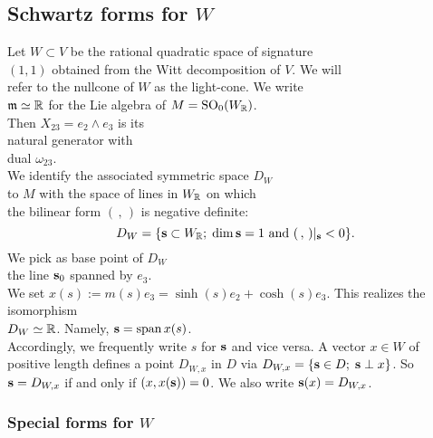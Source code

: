 \subsection{Schwartz forms for $W$}




Let $W\subset V$ be the rational quadratic space of signature\\ $(1,1)$ obtained from the Witt decomposition of $V$. We will\\ refer to the nullcone of $W$ as the light-cone. We write\\
$\mathfrak{m} \simeq \mathbb{R}$ for the Lie algebra of $M = \operatorname{SO}_0(W_{\mathbb{R}})$.\\ Then $X_{23} = e_2 \wedge e_3$ is its\\
natural generator with\\dual $\omega_{23}$.\\
We identify the associated symmetric space $D_W$\\
to $M$ with the space of lines in $W_{\mathbb{R}}$ on which\\
the bilinear form $(\,,\,)$ is negative definite: \[D_W = \{{\bf s} \subset W_{\mathbb{R}} ; \;\text{$\dim {\bf s} =1$ and $(\,,\,)|_{\bf s} < 0$} \}. \] We pick as base point of $D_W$\\
the line ${\bf s}_0$ spanned by $e_3$.\\
We set $ x(s) := m(s) e_3 = \sinh(s) e_2 + \cosh(s) e_3$. This realizes the isomorphism\\
$D_W \simeq \mathbb{R}$. Namely, ${\bf s} = \operatorname{span} x(s)$.\\
Accordingly, we frequently write $s$ for ${\bf s}$ and vice versa. A vector $x \in W$ of positive length defines a point $D_{W,x}$ in $D$ via $D_{W,x} = \{ {\bf s} \in D; \; {\bf s} \perp x \}$. So ${\bf s} = D_{W,x}$ if and only if $(x,x({\bf s})) =0$. We also write ${\bf s}(x)=D_{W,x}$.
\subsubsection{Special forms for $W$}\label{W-forms}

